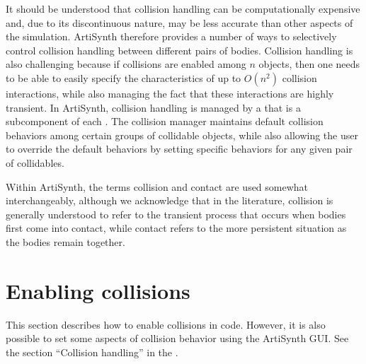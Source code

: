 It should be understood that collision handling can be computationally
expensive and, due to its discontinuous nature, may be less accurate
than other aspects of the simulation.  ArtiSynth therefore provides a
number of ways to selectively control collision handling between
different pairs of bodies.  Collision handling is also challenging
because if collisions are enabled among $n$ objects, then one needs to
be able to easily specify the characteristics of up to $O(n^2)$
collision interactions, while also managing the fact that these
interactions are highly transient.  In ArtiSynth, collision handling
is managed by a
 that is a
subcomponent of each
.  The collision
manager maintains default collision behaviors among certain groups of
collidable objects, while also allowing the user to override the
default behaviors by setting specific behaviors for any given pair of
collidables.

\begin{sideblock}
Within ArtiSynth, the terms collision and contact are used somewhat
interchangeably, although we acknowledge that in the literature,
collision is generally understood to refer to the transient process
that occurs when bodies first come into contact, while contact refers
to the more persistent situation as the bodies remain together.
\end{sideblock}


\section{Enabling collisions}
\label{EnablingCollisions:sec}

\begin{sideblock}
This section describes how to enable collisions in code. However, it
is also possible to set some aspects of collision behavior using the
ArtiSynth GUI. See the section ``Collision handling'' in the
.
\end{sideblock}


